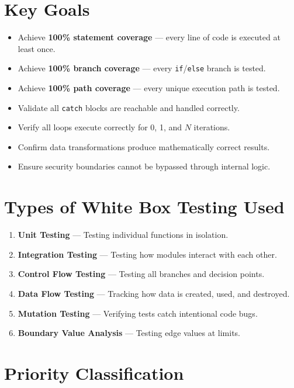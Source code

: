 \documentclass[12pt,a4paper]{report}
\begin{document}
\section{Key Goals}

\begin{itemize}[leftmargin=1.5em]
  \item Achieve \textbf{100\% statement coverage} --- every line of code is executed at least once.
  \item Achieve \textbf{100\% branch coverage} --- every \texttt{if}/\texttt{else} branch is tested.
  \item Achieve \textbf{100\% path coverage} --- every unique execution path is tested.
  \item Validate all \texttt{catch} blocks are reachable and handled correctly.
  \item Verify all loops execute correctly for 0, 1, and $N$ iterations.
  \item Confirm data transformations produce mathematically correct results.
  \item Ensure security boundaries cannot be bypassed through internal logic.
\end{itemize}

\section{Types of White Box Testing Used}

\begin{enumerate}[leftmargin=1.5em]
  \item \textbf{Unit Testing} --- Testing individual functions in isolation.
  \item \textbf{Integration Testing} --- Testing how modules interact with each other.
  \item \textbf{Control Flow Testing} --- Testing all branches and decision points.
  \item \textbf{Data Flow Testing} --- Tracking how data is created, used, and destroyed.
  \item \textbf{Mutation Testing} --- Verifying tests catch intentional code bugs.
  \item \textbf{Boundary Value Analysis} --- Testing edge values at limits.
\end{enumerate}

\section{Priority Classification}
\end{document}
